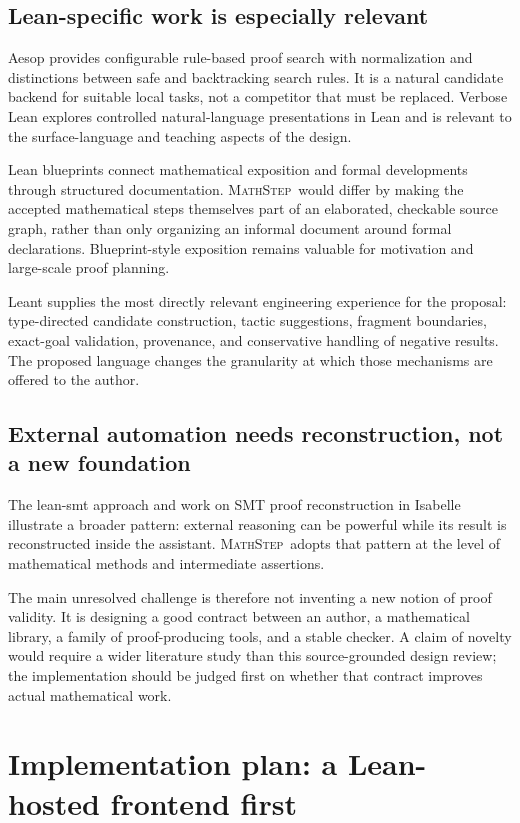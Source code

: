 \documentclass[11pt,a4paper]{article}
\theoremstyle{remark}
\newcommand{\ms}{\textsc{MathStep}}
\begin{document}
\subsection{Lean-specific work is especially relevant}
Aesop provides configurable rule-based proof search with normalization and distinctions between safe and backtracking search rules. It is a natural candidate backend for suitable local tasks, not a competitor that must be replaced.\cite{aesop} Verbose Lean explores controlled natural-language presentations in Lean and is relevant to the surface-language and teaching aspects of the design.\cite{verbose}

Lean blueprints connect mathematical exposition and formal developments through structured documentation.\cite{blueprint} \ms\ would differ by making the accepted mathematical steps themselves part of an elaborated, checkable source graph, rather than only organizing an informal document around formal declarations. Blueprint-style exposition remains valuable for motivation and large-scale proof planning.

Leant supplies the most directly relevant engineering experience for the proposal: type-directed candidate construction, tactic suggestions, fragment boundaries, exact-goal validation, provenance, and conservative handling of negative results. The proposed language changes the granularity at which those mechanisms are offered to the author.\cite{leant-readme,leant-internals}

\subsection{External automation needs reconstruction, not a new foundation}
The lean-smt approach and work on SMT proof reconstruction in Isabelle illustrate a broader pattern: external reasoning can be powerful while its result is reconstructed inside the assistant.\cite{lean-smt,smt-reconstruction} \ms\ adopts that pattern at the level of mathematical methods and intermediate assertions.

The main unresolved challenge is therefore not inventing a new notion of proof validity. It is designing a good contract between an author, a mathematical library, a family of proof-producing tools, and a stable checker. A claim of novelty would require a wider literature study than this source-grounded design review; the implementation should be judged first on whether that contract improves actual mathematical work.

\section{Implementation plan: a Lean-hosted frontend first}\label{sec:implementation}
\end{document}
